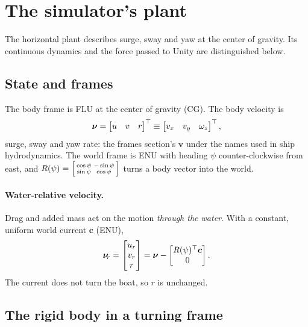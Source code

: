 \section{The simulator's plant}
\label{sec:s2r}
\label{sec:s2r-plant}

The horizontal plant describes surge, sway and yaw at the center of gravity.
Its continuous dynamics and the force passed to Unity are distinguished below.

\subsection{State and frames}

The body frame is FLU at the center of gravity (CG). The body velocity is
\[
  \bm{\nu} = \begin{bmatrix} u & v & r\end{bmatrix}^\top
       \equiv \begin{bmatrix} v_x & v_y & \omega_z\end{bmatrix}^\top ,
\]
surge, sway and yaw rate: the frames section's $\bm v$ under the names used in
ship hydrodynamics. The world frame is ENU with heading
$\psi$ counter-clockwise from east, and
$R(\psi) = \left[\begin{smallmatrix}\cos\psi & -\sin\psi\\ \sin\psi & \cos\psi\end{smallmatrix}\right]$
turns a body vector into the world.

\paragraph{Water-relative velocity.} Drag and added mass act on the motion
\emph{through the water}. With a constant, uniform world current $\bm c$ (ENU),
\[
  \bm{\nu}_{\!r} = \begin{bmatrix} u_r\\ v_r\\ r\end{bmatrix}
       = \bm{\nu} - \begin{bmatrix} R(\psi)^\top \bm c\\ 0\end{bmatrix}.
\]
The current does not turn the boat, so $r$ is unchanged.

\subsection{The rigid body in a turning frame}
\label{sec:s2r-rigid}

